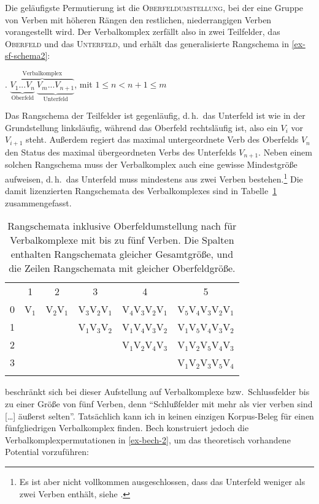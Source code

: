 Die geläufigste Permutierung ist die \textsc{Oberfeldumstellung}, bei der eine Gruppe von Verben mit höheren Rängen den restlichen, niederrangigen Verben vorangestellt wird. Der Verbalkomplex zerfällt also in zwei Teilfelder, das \textsc{Oberfeld} und das \textsc{Unterfeld}, und erhält das generalisierte Rangschema in \ref{ex-sf-schema2}: 

\ex.   $\overbrace{\underbrace{V_1 ... V_{n}}_{\text{Oberfeld}} \ \underbrace{V_{m} ... V_{n+1}}_{\text{Unterfeld}}}^{\text{Verbalkomplex}}$, mit $1 \leq n < n+1 \leq m$ \label{ex-sf-schema2}

Das Rangschema der Teilfelder ist gegenläufig, d.\,h.\ das Unterfeld ist wie in der Grundstellung linksläufig, während das Oberfeld rechtsläufig ist, also ein $V_i$ vor $V_{i+1}$ steht. Au\ss erdem regiert das maximal untergeordnete Verb des Oberfelds $V_n$ den Status des maximal übergeordneten Verbs des Unterfelds $V_{n+1}$. Neben einem solchen Rangschema muss der Verbalkomplex auch eine gewisse Mindestgrö\ss e aufweisen, d.\,h.\ das Unterfeld muss mindestens aus zwei Verben bestehen.\footnote{Es ist aber nicht vollkommen ausgeschlossen, dass das Unterfeld weniger als zwei Verben enthält, siehe \citet[83]{Meurers:99}.} Die damit lizenzierten Rangschemata des Verbalkomplexes sind in Tabelle~\ref{fig-oberfeld} zusammengefasst.
\begin{table}[t]
\centering
\begin{tabular}{cccccc}
\lsptoprule
& 1	& 2	& 3	& 4	& 5	\\
\cmidrule{2-6}
0	& V$_1$	& V$_2$V$_1$ & V$_3$V$_2$V$_1$ & V$_4$V$_3$V$_2$V$_1$ & V$_5$V$_4$V$_3$V$_2$V$_1$ \\
1	& 	& 	     & V$_1$V$_3$V$_2$ & V$_1$V$_4$V$_3$V$_2$ & V$_1$V$_5$V$_4$V$_3$V$_2$ \\
2	&	&	     &		       & V$_1$V$_2$V$_4$V$_3$ & V$_1$V$_2$V$_5$V$_4$V$_3$ \\
3	& 	& 	     & 		       & 		      & V$_1$V$_2$V$_3$V$_5$V$_4$ \\
\lspbottomrule
\end{tabular} 
\caption{Rangschemata inklusive Oberfeldumstellung nach \citet[\S 61]{Bech:55} für Verbalkomplexe mit bis zu fünf Verben. Die Spalten enthalten Rangschemata gleicher Gesamtgrö\ss e, und die Zeilen Rangschemata mit gleicher Oberfeldgrö\ss e.\label{fig-oberfeld}}
\end{table}
\citet[\S 61]{Bech:55} beschränkt sich bei dieser Aufstellung auf Verbalkomplexe bzw.\ Schlussfelder bis zu einer Grö\ss e von fünf Verben, denn "`Schlu\ss felder mit mehr als vier verben sind [\ldots] äu\ss erst selten"'. Tatsächlich kann ich in \cite{Bech:55} keinen einzigen Korpus-Beleg für einen fünfgliedrigen Verbalkomplex finden. Bech konstruiert jedoch die Verbalkomplexpermutationen in \ref{ex-bech-2}, um das theoretisch vorhandene Potential vorzuführen:

